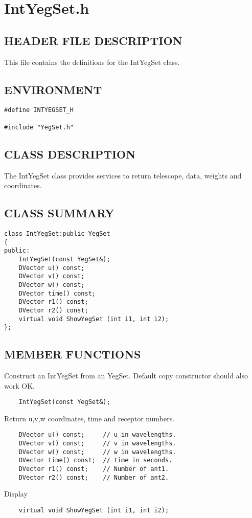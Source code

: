 \clearpage
\section{IntYegSet.h}

\subsection*{HEADER FILE DESCRIPTION}
 This file contains the definitions for the IntYegSet class.
  
\subsection*{ENVIRONMENT}
\begin{verbatim}
#define INTYEGSET_H

#include "YegSet.h"
\end{verbatim}

\subsection*{CLASS DESCRIPTION}
   The IntYegSet class provides services to return telescope, data, weights
   and coordinates.

\subsection*{CLASS SUMMARY}
\begin{verbatim}
class IntYegSet:public YegSet
{
public:
    IntYegSet(const YegSet&);
    DVector u() const;
    DVector v() const;
    DVector w() const;
    DVector time() const;
    DVector r1() const;
    DVector r2() const;
    virtual void ShowYegSet (int i1, int i2);
};
\end{verbatim}

\subsection*{MEMBER FUNCTIONS}

    Construct an IntYegSet from an YegSet.
    Default copy constructor should also work OK.
\begin{verbatim}
    IntYegSet(const YegSet&);
\end{verbatim}

   Return u,v,w coordinates, time and receptor numbers.
\begin{verbatim}
    DVector u() const;     // u in wavelengths.
    DVector v() const;     // v in wavelengths.
    DVector w() const;     // w in wavelengths.
    DVector time() const;  // time in seconds.
    DVector r1() const;    // Number of ant1.
    DVector r2() const;    // Number of ant2.
\end{verbatim}

   Display
\begin{verbatim}
    virtual void ShowYegSet (int i1, int i2);
\end{verbatim}

